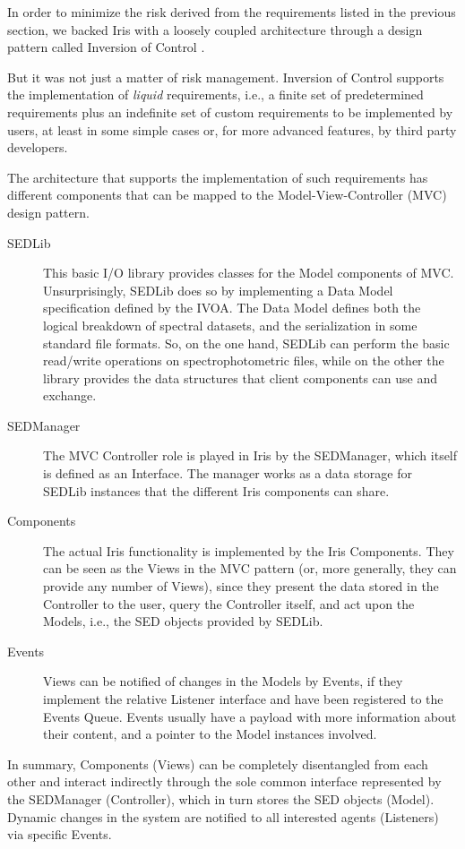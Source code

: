 \documentclass[preprint,authoryear,5p]{elsarticle}
\begin{document}
In order to minimize the risk derived from the requirements listed in the previous 
section, we backed Iris with a loosely coupled architecture through a design 
pattern called Inversion of Control \citep*{ioc}. 

But it was not just a matter of risk management. Inversion of Control  
supports the implementation of \emph{liquid} requirements, i.e., a finite set of
predetermined requirements plus an indefinite set of custom requirements to be
implemented by users, at least in some simple cases or, for more advanced
features, by third party developers.

The architecture that supports the implementation of such requirements has
different components that can be mapped to the Model-View-Controller (MVC)
design pattern.
\begin{description}
\item[SEDLib] This basic I/O library provides
classes for the Model components of MVC. Unsurprisingly, SEDLib does so by
implementing a Data Model specification defined by the IVOA. The Data Model
defines both the logical breakdown of spectral datasets, and the serialization
in some standard file formats. So, on the one hand, SEDLib can perform the basic
read/write operations on spectrophotometric files, while on the other the library
provides the data structures that client components can use and exchange.
\item[SEDManager] The MVC Controller role is played in Iris by the SEDManager,
which itself is defined as an Interface. The manager works as a data storage for
SEDLib instances that the different Iris components can share.
\item[Components] The actual Iris functionality is im\-ple\-ment\-ed by the Iris
Components. They can be seen as the Views in the MVC pattern (or, more
generally, they can provide any number of Views), since they present the data
stored in the Controller to the user, query the Controller itself, and act upon
the Models, i.e., the SED objects provided by SEDLib. 
\item[Events] Views can be
notified of changes in the Models by Events, if they implement the relative
Listener interface and have been registered to the Events Queue. Events usually
have a payload with more information about their content, and a pointer to the
Model instances involved.
\end{description}

\begin{sloppypar}
In summary, Components (Views) can be completely disentangled from each other
and interact indirectly through the sole common interface represented by the
SEDManager (Controller), which in turn stores the SED objects (Model). Dynamic
changes in the system are notified to all interested agents (Listeners) via
specific Events.
\end{sloppypar}
\end{document}
